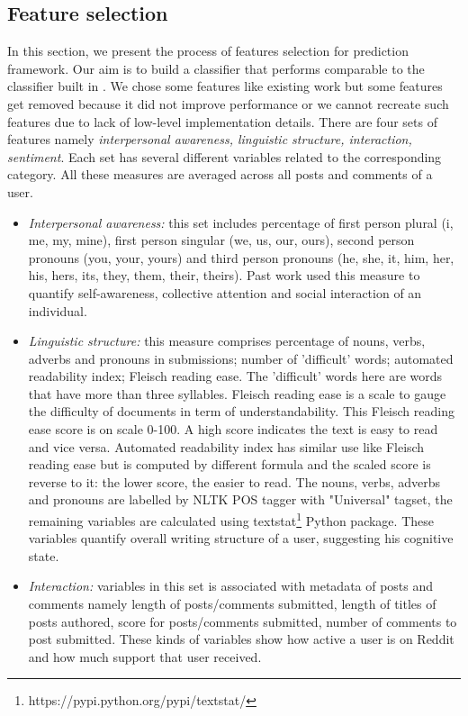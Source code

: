 \subsection{Feature selection}
In this section, we present the process of features selection for prediction framework. Our aim is to build a classifier that performs comparable to the classifier built in \cite{DeChoudhury2016}. We chose some features like existing work but some features get removed because it did not improve performance or we cannot recreate such features due to lack of low-level implementation details. There are four sets of features namely \textit{interpersonal awareness, linguistic structure, interaction, sentiment}. Each set has several different variables related to the corresponding category. All these measures are averaged across all posts and comments of a user.
\begin{itemize}
\item \textit{Interpersonal awareness:} this set includes percentage of first person plural (i, me, my, mine), first person singular (we, us, our, ours), second person pronouns (you, your, yours) and third person pronouns (he, she, it, him, her, his, hers, its, they, them, their, theirs). Past work \cite{DeChoudhury2013} used this measure to quantify self-awareness, collective attention and social interaction of an individual.
\item \textit{Linguistic structure:} this measure comprises percentage of nouns, verbs, adverbs and pronouns in submissions; number of 'difficult' words; automated readability index; Fleisch reading ease. The 'difficult' words here are words that have more than three syllables. Fleisch reading ease is a scale to gauge the difficulty of documents in term of understandability. This Fleisch reading ease score is on scale 0-100. A high score indicates the text is easy to read and vice versa. Automated readability index has similar use like Fleisch reading ease but is computed by different formula and the scaled score is reverse to it: the lower score, the easier to read. The nouns, verbs, adverbs and pronouns are labelled by NLTK POS tagger with "Universal" tagset, the remaining variables are calculated using textstat\footnote{https://pypi.python.org/pypi/textstat/} Python package. These variables quantify overall writing structure of a user, suggesting his cognitive state.
\item \textit{Interaction:} variables in this set is associated with metadata of posts and comments namely length of posts/comments submitted, length of titles of posts authored, score for posts/comments submitted, number of comments to post submitted. These kinds of variables show how active a user is on Reddit and how much support that user received.

\end{itemize}
